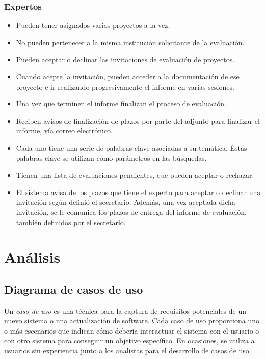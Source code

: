 \documentclass[11pt,a4paper,spanish,twoside]{book}
\begin{document}
\subsection{Expertos}
\begin{itemize}
\item Pueden tener asignados varios proyectos a la vez. 
\item No pueden pertenecer a la misma institución solicitante de la evaluación.
\item Pueden aceptar o declinar las invitaciones de evaluación de proyectos.
\item Cuando acepte la invitación, pueden acceder a la documentación de ese
  proyecto e ir realizando progresivamente el informe en varias sesiones. 
\item Una vez que terminen el informe finalizan el proceso de evaluación.
\item Reciben avisos de finalización de plazos por parte del adjunto para
  finalizar el informe, vía correo electrónico.
\item Cada uno tiene una serie de palabras clave asociadas a su
  temática. Éstas palabras clave se utilizan como parámetros en las
  búsquedas. 
\item Tienen una lista de evaluaciones pendientes, que pueden aceptar o 
  rechazar.
\item El sistema avisa de los plazos que tiene el experto para aceptar o
  declinar una invitación según definió el secretario. Además, una vez
  aceptada dicha invitación, se le comunica los plazos de entrega del informe
  de evaluación, también definidos por el secretario.   

\end{itemize}


\chapter{Análisis}

\section{Diagrama de casos de uso}
Un \emph{caso de uso} es una técnica para la captura de requisitos
potenciales de un nuevo sistema o una actualización de software. Cada caso de
uso proporciona uno o más escenarios que indican cómo debería interactuar el
sistema con el usuario o con otro sistema para conseguir un objetivo
específico. En ocasiones, se utiliza a usuarios sin experiencia junto a los
analistas para el desarrollo de casos de uso.
\end{document}
